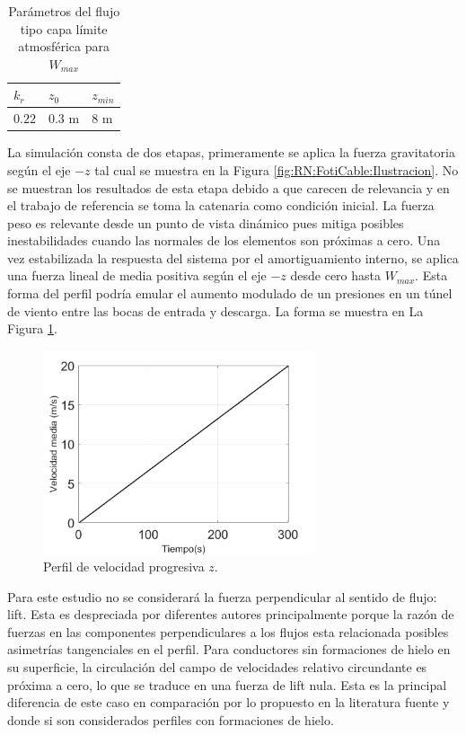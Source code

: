 \begin{table}[htbp]
	\begin{center}
		\begin{tabular}{ | m{2cm} | m{2cm} | m{2cm} | }
			\hline $k_r$ & $z_0$& $z_{min}$  \\ \hline
			$0.22$ &$0.3$ m & $8$ m     \\ \hline
		\end{tabular}
	\end{center}
	\caption{Parámetros del flujo tipo capa límite atmosférica para $W_{max}$ }
	\label{table:RN:propiedadesFlujo}
\end{table}

La simulación consta de dos etapas, primeramente se aplica la fuerza gravitatoria según el eje $-z$ tal cual se muestra en la Figura \ref{fig:RN:FotiCable:Ilustracion}. No se muestran los resultados de esta etapa debido a que carecen de relevancia y en el trabajo de referencia se toma la catenaria como condición inicial. La fuerza peso es relevante desde un punto de vista dinámico pues mitiga posibles inestabilidades cuando las normales de los elementos son próximas a cero. Una vez estabilizada la respuesta del sistema por el amortiguamiento interno, se aplica una fuerza lineal de media positiva según el eje $-z$ desde cero hasta $W_{max}$. Esta forma del perfil podría emular el aumento modulado de un presiones en un túnel de viento entre las bocas de entrada y descarga. La forma se muestra en La Figura \ref{fig:RN:FotiCable:VelocidadCable}.
\begin{figure}[ht!]
	\centering
	\includegraphics[width=80mm]{./imagenes/ResultadosNumericos/SimpleCable/PerfilVm_TL_Foti.png}
	\caption{Perfil de velocidad progresiva $z$.}
	\label{fig:RN:FotiCable:VelocidadCable}
\end{figure}

Para este estudio no se considerará la fuerza perpendicular al sentido de flujo: lift. Esta es despreciada por diferentes autores \citep{lee1992nonlinear} \citep{Foti2016} \citep{Papailiou1997} principalmente porque la razón de fuerzas en las componentes perpendiculares a los flujos esta relacionada posibles asimetrías tangenciales en el perfil. Para conductores sin formaciones de hielo en su superficie, la circulación del campo de velocidades relativo circundante es próxima a cero, lo que se traduce en una fuerza de lift nula. Esta es la principal diferencia de este caso en comparación por lo propuesto en la literatura fuente \citep{luongo1984planar} y \citep{foti2018finite} donde si son considerados perfiles con formaciones de hielo.

